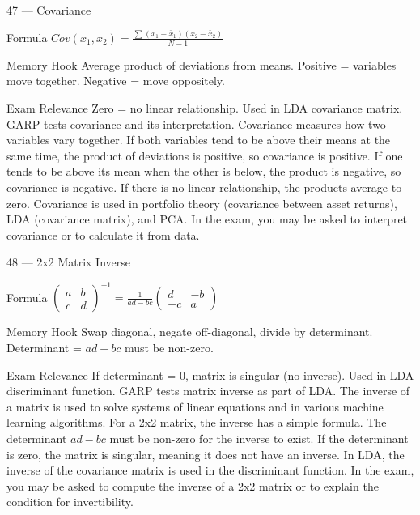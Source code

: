 \documentclass[aspectratio=169,8pt]{beamer}
\begin{document}
	\begin{frame}{47 --- Covariance}
		\begin{block}{Formula}
			$Cov(x_1, x_2) = \frac{\sum(x_1 - \bar{x}_1)(x_2 - \bar{x}_2)}{N-1}$
		\end{block}
		\begin{block}{Memory Hook}
			Average product of deviations from means. Positive = variables move together. Negative = move oppositely.
		\end{block}
		\begin{block}{Exam Relevance}
			Zero = no linear relationship. Used in LDA covariance matrix. GARP tests covariance and its interpretation. Covariance measures how two variables vary together. If both variables tend to be above their means at the same time, the product of deviations is positive, so covariance is positive. If one tends to be above its mean when the other is below, the product is negative, so covariance is negative. If there is no linear relationship, the products average to zero. Covariance is used in portfolio theory (covariance between asset returns), LDA (covariance matrix), and PCA. In the exam, you may be asked to interpret covariance or to calculate it from data.
		\end{block}
	\end{frame}
	
	\begin{frame}{48 --- 2x2 Matrix Inverse}
		\begin{block}{Formula}
			$\begin{pmatrix} a & b \\ c & d \end{pmatrix}^{-1} = \frac{1}{ad-bc}\begin{pmatrix} d & -b \\ -c & a \end{pmatrix}$
		\end{block}
		\begin{block}{Memory Hook}
			Swap diagonal, negate off-diagonal, divide by determinant. Determinant = $ad-bc$ must be non-zero.
		\end{block}
		\begin{block}{Exam Relevance}
			If determinant = 0, matrix is singular (no inverse). Used in LDA discriminant function. GARP tests matrix inverse as part of LDA. The inverse of a matrix is used to solve systems of linear equations and in various machine learning algorithms. For a 2x2 matrix, the inverse has a simple formula. The determinant $ad-bc$ must be non-zero for the inverse to exist. If the determinant is zero, the matrix is singular, meaning it does not have an inverse. In LDA, the inverse of the covariance matrix is used in the discriminant function. In the exam, you may be asked to compute the inverse of a 2x2 matrix or to explain the condition for invertibility.
		\end{block}
	\end{frame}
	
\end{document}

